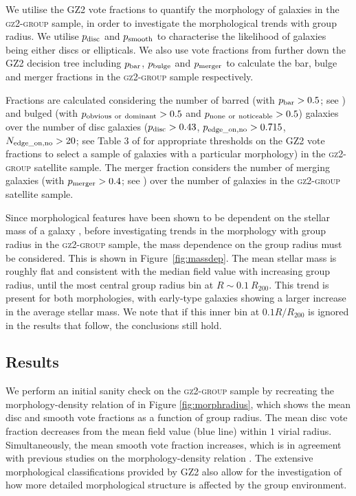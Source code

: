 \documentclass[useAMS,usenatbib]{mn2e}
\begin{document}
We utilise the GZ2 vote fractions to quantify the morphology of galaxies in the \textsc{gz2-group} sample, in order to investigate the morphological trends with group radius. We utilise $p_{\rm{disc}}$ and $p_{\rm{smooth}}$ to characterise the likelihood of galaxies being either discs or ellipticals. We also use vote fractions from further down the GZ2 decision tree including $p_{\rm{bar}}$, $p_{\rm{bulge}}$ and $p_{\rm{merger}}$ to calculate the bar, bulge and merger fractions in the \textsc{gz2-group} sample respectively. 

Fractions are calculated considering the number of barred (with $p_{\rm{bar}} > 0.5$; see \citealt{masters11a, Cheung13}) and bulged (with $p_{\rm{obvious}~\rm{or}~\rm{dominant}} > 0.5$ and $p_{\rm{none}~\rm{or}~\rm{noticeable}} > 0.5$) galaxies over the number of disc galaxies ($p_{\rm{disc}} > 0.43$, $p_{\rm{edge\_on, no}} > 0.715$, $N_{\rm{edge\_on, no}} > 20$; see Table 3 of \citealt{GZ2} for appropriate thresholds on the GZ2 vote fractions to select a sample of galaxies with a particular morphology) in the \textsc{gz2-group} satellite sample. The merger fraction considers the number of merging galaxies (with $p_{\rm{merger}} > 0.4$; see \citealt{Darg10a}) over the number of galaxies in the \textsc{gz2-group} satellite sample. 

Since morphological features have been shown to be dependent on the stellar mass of a galaxy \citep[e.g. the increase in the bar fraction with stellar mass; see][]{nair10, skibba12}, before investigating trends in the morphology with group radius in the \textsc{gz2-group} sample, the mass dependence on the group radius must be considered. This is shown in Figure~\ref{fig:massdep}. The mean stellar mass is roughly flat and consistent with the median field value with increasing group radius, until the most central group radius bin at $R \sim 0.1~R_{200}$. This trend is present for both morphologies, with early-type galaxies showing a larger increase in the average stellar mass. We note that if this inner bin at $0.1 R/R_{200}$ is ignored in the results that follow, the conclusions still hold. 

\subsection{Results}

We perform an initial sanity check on the \textsc{gz2-group} sample by recreating the morphology-density relation of \citet{dressler80} in Figure \ref{fig:morphradius}, which shows the mean disc and smooth vote fractions as a function of group radius. The mean disc vote fraction decreases from the mean field value (blue line) within $1$ virial radius. Simultaneously, the mean smooth vote fraction increases, which is in agreement with previous studies on the morphology-density relation \citep{dressler80, smail97, poggianti99, postman05, Bamford09}. The extensive morphological classifications provided by GZ2 also allow for the investigation of how more detailed morphological structure is affected by the group environment.  
\end{document}
